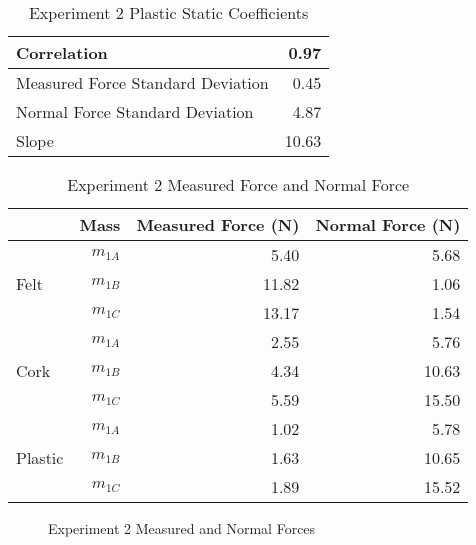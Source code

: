 \documentclass [12pt, letterpaper, twoside] {article}
\begin{document}
\begin {table}[h]
  \centering
    \begin {tabular} {| l | r |}
      \hline\hline
      Correlation & 0.97 \\ %
      \hline
      Measured Force Standard Deviation & 0.45 \\ %
      \hline
      Normal Force Standard Deviation & 4.87 \\ %
      \hline
      Slope & 10.63 \\ %
      \hline\hline
    \end {tabular}
  \caption {Experiment 2 Plastic Static Coefficients}
\end {table}

\begin {table}[h]
  \centering
  \begin {tabular} {| l | r | r | r |}
    \hline\hline
    & Mass & Measured Force (N) & Normal Force (N) \\
    \hline
    \multirow {3}{*}{Felt} & \(m_{1A}\) & 5.40 & 5.68 \\ %
    & \(m_{1B}\) & 11.82 & 1.06 \\ %
    & \(m_{1C}\) & 13.17 & 1.54 \\ %
    \hline
    \multirow {3}{*}{Cork} & \(m_{1A}\) & 2.55 & 5.76 \\ %
    & \(m_{1B}\) & 4.34 & 10.63 \\ %
    & \(m_{1C}\) & 5.59 & 15.50 \\ %
    \hline
    \multirow {3}{*}{Plastic} & \(m_{1A}\) & 1.02 & 5.78 \\ %
    & \(m_{1B}\) & 1.63 & 10.65 \\ %
    & \(m_{1C}\) & 1.89 & 15.52 \\ %
    \hline
  \end {tabular}
  \caption {Experiment 2 Measured Force and Normal Force}
\end {table}

\begin{figure}[h!]
  \centering
  \caption {Experiment 2 Measured and Normal Forces}
\end{figure}
\end{document}
